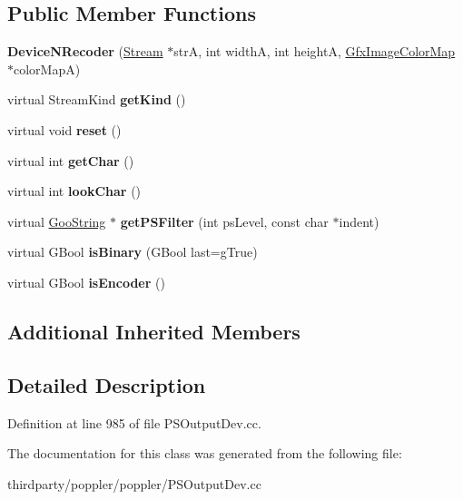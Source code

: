 \subsection*{Public Member Functions}
\begin{DoxyCompactItemize}
\item 
\mbox{\label{class_device_n_recoder_afb49ed5da81c1fab0cc02f8061f1230e}} 
{\bfseries Device\+N\+Recoder} (\hyperlink{class_stream}{Stream} $\ast$strA, int widthA, int heightA, \hyperlink{class_gfx_image_color_map}{Gfx\+Image\+Color\+Map} $\ast$color\+MapA)
\item 
\mbox{\label{class_device_n_recoder_a0e6e49e40fc72968ebf78d4c51714744}} 
virtual Stream\+Kind {\bfseries get\+Kind} ()
\item 
\mbox{\label{class_device_n_recoder_aacda548b2df459b303598a1b63e76029}} 
virtual void {\bfseries reset} ()
\item 
\mbox{\label{class_device_n_recoder_a417a57f8ae28f6089b41da62c67f30e6}} 
virtual int {\bfseries get\+Char} ()
\item 
\mbox{\label{class_device_n_recoder_afdbb09adeb24a41dbd977f912a863d1e}} 
virtual int {\bfseries look\+Char} ()
\item 
\mbox{\label{class_device_n_recoder_a2ccf171ec8cfbff41eac4e20c6b88461}} 
virtual \hyperlink{class_goo_string}{Goo\+String} $\ast$ {\bfseries get\+P\+S\+Filter} (int ps\+Level, const char $\ast$indent)
\item 
\mbox{\label{class_device_n_recoder_aa1d6b27bd96a5c79cefa4a35e88cfb8c}} 
virtual G\+Bool {\bfseries is\+Binary} (G\+Bool last=g\+True)
\item 
\mbox{\label{class_device_n_recoder_a49b6a354a15a7fcb16e05c735a688fae}} 
virtual G\+Bool {\bfseries is\+Encoder} ()
\end{DoxyCompactItemize}
\subsection*{Additional Inherited Members}


\subsection{Detailed Description}


Definition at line 985 of file P\+S\+Output\+Dev.\+cc.



The documentation for this class was generated from the following file\+:\begin{DoxyCompactItemize}
\item 
thirdparty/poppler/poppler/P\+S\+Output\+Dev.\+cc\end{DoxyCompactItemize}
